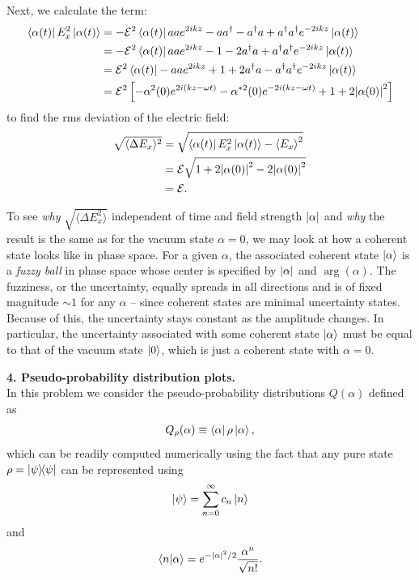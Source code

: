 \documentclass{article}
\theoremstyle{definition}
\newcommand{\al}{\alpha}
\newcommand{\f}[2]{\frac{#1}{#2}}
\newcommand{\lb}{\left[}
\newcommand{\rb}{\right]}
\begin{document}
\begin{enumerate}[label=\alph*)]
	Next, we calculate the term:
	\begin{align*}
		\bra{\al(t)} E_x^2 \ket{\al(t)} 
		&= -\mathcal{E}^2 \bra{\al(t)} a a e^{2ikz} -aa^\dagger - a^\dagger a + a^\dagger a^\dagger e^{-2ikz} \ket{\al(t)} \\
		&= -\mathcal{E}^2 \bra{\al(t)} a a e^{2ikz} -1  - 2a^\dagger a + a^\dagger a^\dagger e^{-2ikz} \ket{\al(t)} \\
		&= \mathcal{E}^2 \bra{\al(t)} - a a e^{2ikz} + 1  +  2a^\dagger a - a^\dagger a^\dagger e^{-2ikz} \ket{\al(t)} \\
		&= \mathcal{E}^2 \lb -\al^2(0) e^{2i(kz-\omega t)}  - \al^{*2}(0) e^{-2i(kz-\omega t)} + 1 + 2\abs{\al(0)}^2\rb
	\end{align*}
	to find the rms deviation of the electric field:
	\begin{align*}
		\sqrt{\langle \Delta E_x \rangle^2} 
		&= \sqrt{\bra{\al(t)} E_x^2 \ket{\al(t)} - {\langle E_x \rangle}^2} \\
		&= \mathcal{E}\sqrt{   1 + 2\abs{\al(0)}^2  -2\abs{\al(0)}^2  } \\
		&= \mathcal{E}.
	\end{align*}

	To see \textit{why}  $\sqrt{\langle \Delta E_x^2\rangle} $ independent of time and field strength $\abs{\al}$ and \textit{why} the result is the same as for the vacuum state $\al =0$, we may look at how a coherent state looks like in phase space. For a given $\al$, the associated coherent state $\ket{\al}$ is a \textit{fuzzy ball} in phase space whose center is specified by $\abs{\al}$ and $\arg(\al)$. The fuzziness, or the uncertainty, equally spreads in all directions and is of fixed magnitude $\sim 1$ for any $\al$ -- since coherent states are minimal uncertainty states. Because of this, the uncertainty stays constant as the amplitude changes. In particular, the uncertainty associated with some coherent state $\ket{\al}$ must be equal to that of the vacuum state $\ket{0}$, which is just a coherent state with $\al=0$. 
\end{enumerate}




\noindent \textbf{4. Pseudo-probability distribution plots.} \\

\noindent In this problem we consider the pseudo-probability distributions $Q(\al)$ defined as 
\begin{align*}
	Q_\rho(\al) \equiv \bra{\al} \rho\ket{\al},
\end{align*}
which can be readily computed numerically using the fact that any pure state $\rho = \ketbra{\psi}$ can be represented using 
\begin{align*}
	\ket{\psi} = \sum_{n=0}^\infty c_n \ket{n}
\end{align*}
and 
\begin{align*}
	\braket{n}{\al} = e^{-\abs{\al}^2/2} \f{\al^n}{\sqrt{n!}}.
\end{align*}
\end{document}
